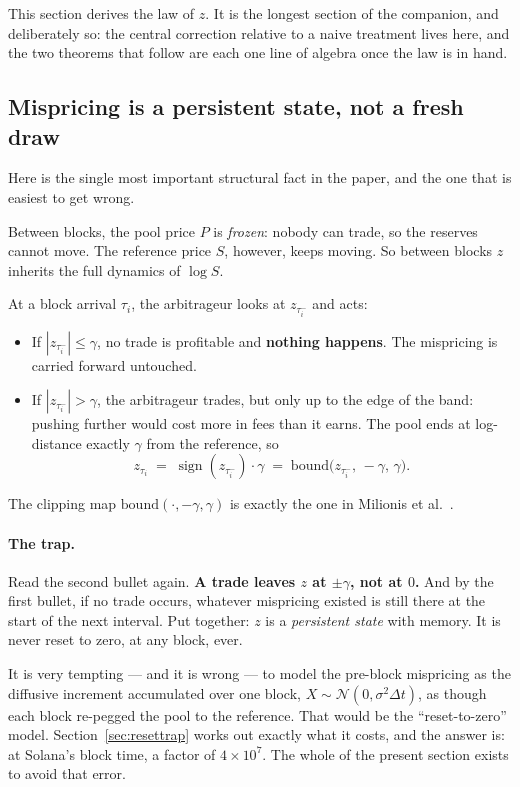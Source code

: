 \documentclass[11pt]{article}
\theoremstyle{definition}
\theoremstyle{remark}
\newcommand{\dt}{\Delta t}
\newcommand{\1}{\mathbf{1}}
\newcommand{\bound}{\mathrm{bound}}
\DeclareMathOperator{\sgn}{sign}
\begin{document}
This section derives the law of $z$. It is the longest section of the companion, and deliberately so: the central correction relative to a naive treatment lives here, and the two theorems that follow are each one line of algebra once the law is in hand.

\subsection{Mispricing is a persistent state, not a fresh draw}

Here is the single most important structural fact in the paper, and the one that is easiest to get wrong.

Between blocks, the pool price $P$ is \emph{frozen}: nobody can trade, so the reserves cannot move. The reference price $S$, however, keeps moving. So between blocks $z$ inherits the full dynamics of $\log S$.

At a block arrival $\tau_i$, the arbitrageur looks at $z_{\tau_i^-}$ and acts:
\begin{itemize}[leftmargin=2em]
\item If $|z_{\tau_i^-}| \le \gamma$, no trade is profitable and \textbf{nothing happens}. The mispricing is carried forward untouched.
\item If $|z_{\tau_i^-}| > \gamma$, the arbitrageur trades, but only up to the edge of the band: pushing further would cost more in fees than it earns. The pool ends at log-distance exactly $\gamma$ from the reference, so
\[
z_{\tau_i} \;=\; \sgn(z_{\tau_i^-})\cdot\gamma \;=\; \bound\big(z_{\tau_i^-},\,-\gamma,\,\gamma\big).
\]
\end{itemize}
The clipping map $\bound(\cdot,-\gamma,\gamma)$ is exactly the one in Milionis et al.~\cite[Eqs.~(7)--(9)]{milionis2023automated}.

\paragraph{The trap.} Read the second bullet again. \textbf{A trade leaves $z$ at $\pm\gamma$, not at $0$.} And by the first bullet, if no trade occurs, whatever mispricing existed is still there at the start of the next interval. Put together: $z$ is a \emph{persistent state} with memory. It is never reset to zero, at any block, ever.

It is very tempting --- and it is wrong --- to model the pre-block mispricing as the diffusive increment accumulated over one block, $X \sim \mathcal N(0,\sigma^2\dt)$, as though each block re-pegged the pool to the reference. That would be the ``reset-to-zero'' model. Section~\ref{sec:resettrap} works out exactly what it costs, and the answer is: at Solana's block time, a factor of $4\times10^7$. The whole of the present section exists to avoid that error.
\end{document}
